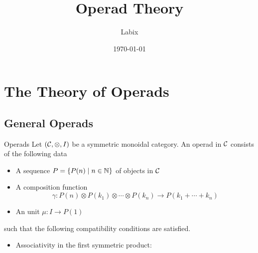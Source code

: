 \documentclass[a4paper]{article}
\title{Operad Theory}
\author{Labix}
\date{\today}
\begin{document}
\maketitle
\begin{abstract}
\begin{itemize}
\end{itemize}
\end{abstract}
\pagebreak
\tableofcontents
\pagebreak

\section{The Theory of Operads}
\subsection{General Operads}
\begin{defn}{Operads}{} Let $(\mathcal{C},\otimes,I)$ be a symmetric monoidal category. An operad in $\mathcal{C}$ consists of the following data
\begin{itemize}
\item A sequence $P=\{P(n)\;|\;n\in\mathbb{N}\}$ of objects in $\mathcal{C}$
\item A composition function $$\gamma:P(n)\otimes P(k_1)\otimes\cdots\otimes P(k_n)\to P(k_1+\cdots+k_n)$$
\item An unit $\mu:I\to P(1)$
\end{itemize}
such that the following compatibility conditions are satisfied. 
\begin{itemize}
\item Associativity in the first symmetric product: \\~\\
\end{itemize}
\end{defn}
\end{document}
